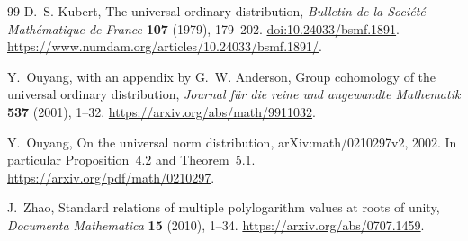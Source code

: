 \begin{thebibliography}{99}
D.~S. Kubert, The universal ordinary distribution,
\emph{Bulletin de la Soci\'et\'e Math\'ematique de France}
\textbf{107} (1979), 179--202.
\href{https://doi.org/10.24033/bsmf.1891}{doi:10.24033/bsmf.1891}.
\url{https://www.numdam.org/articles/10.24033/bsmf.1891/}.

Y.~Ouyang, with an appendix by G.~W. Anderson,
Group cohomology of the universal ordinary distribution,
\emph{Journal f\"ur die reine und angewandte Mathematik}
\textbf{537} (2001), 1--32.
\url{https://arxiv.org/abs/math/9911032}.

Y.~Ouyang, On the universal norm distribution,
arXiv:math/0210297v2, 2002.
In particular Proposition~4.2 and Theorem~5.1.
\url{https://arxiv.org/pdf/math/0210297}.

J.~Zhao, Standard relations of multiple polylogarithm values at roots
of unity, \emph{Documenta Mathematica} \textbf{15} (2010), 1--34.
\url{https://arxiv.org/abs/0707.1459}.

\end{thebibliography}
